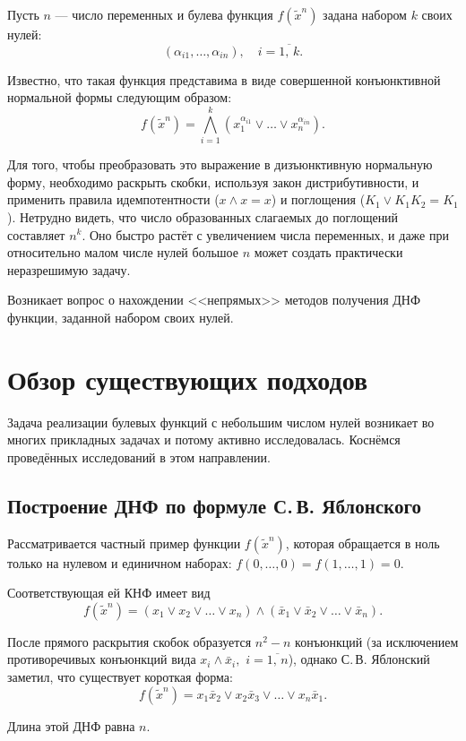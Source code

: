 \documentclass[12pt,a4paper,oneside,fleqn,leqno]{article}
\theoremstyle{definition}
\begin{document}
	Пусть $n$ --- число переменных и булева функция $f(\tilde x^n)$ задана набором $k$ своих нулей:
	$$
		(\alpha_{i1},\ldots,\alpha_{in}),\quad i=\overline{1,\,k}.
	$$\par
	Известно, что такая функция представима в виде совершенной конъюнктивной нормальной формы следующим образом:
	$$
		f(\tilde x^n) = \bigwedge_{i = 1}^k (x_1^{\alpha_{i1}} \vee \ldots \vee x_n^{\alpha_{in}}).
	$$\par
	Для того, чтобы преобразовать это выражение в дизъюнктивную нормальную форму, необходимо раскрыть скобки, используя закон дистрибутивности, и применить правила идемпотентности ($x\wedge x = x$) и поглощения ($K_1 \vee K_1K_2 = K_1$). %
Нетрудно видеть, что число образованных слагаемых до поглощений составляет $n^k.$ Оно быстро растёт с увеличением числа переменных, и даже при относительно малом числе нулей большое $n$ может создать практически неразрешимую задачу.\par
	Возникает вопрос о нахождении <<непрямых>> методов получения ДНФ функции, заданной набором своих нулей.
	\section{Обзор существующих подходов}
		Задача реализации булевых функций с небольшим числом нулей возникает во многих прикладных задачах и потому активно исследовалась. Коснёмся проведённых исследований в этом направлении.
		\subsection{Построение ДНФ по формуле С.\,В. Яблонского}\label{jab}
			Рассматривается частный пример функции $f(\tilde x^n)$, которая обращается в ноль только на нулевом и единичном наборах: $f(0,\ldots,0) = f(1,\ldots,1) = 0.$\par
			Соответствующая ей КНФ имеет вид
			$$
				f(\tilde x^n) = (x_1 \vee x_2 \vee \ldots \vee x_n)\wedge(\bar{x}_1 \vee \bar{x}_2 \vee \ldots \vee \bar{x}_n).
			$$\par
			После прямого раскрытия скобок образуется $n^2 - n$ конъюнкций (за исключением противоречивых конъюнкций вида $x_i\wedge\bar{x}_i,\,\,i = \overline{1,\,n}$), однако С.\,В. Яблонский заметил, что существует короткая форма:
			$$
				f(\tilde x^n) = x_1\bar{x}_2 \vee x_2\bar{x}_3 \vee \ldots \vee x_n \bar{x}_1.
			$$\par
			Длина этой ДНФ равна $n.$
\end{document}
